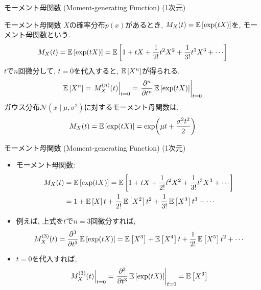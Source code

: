 \documentclass[dvipdfmx,notheorems,t]{beamer}
\begin{document}
\begin{frame}{モーメント母関数 (Moment-generating Function) (1次元)}
\begin{block}{モーメント母関数}
  $X$の確率分布$p(x)$があるとき, $M_X(t) = \operatorname{\mathbb{E}} \left[ \exp(tX) \right]$を, モーメント母関数という.
  \begin{align*}
    M_X(t) = \E{\exp(tX)} = \E{1 + tX + \frac{1}{2!} t^2 X^2 + \frac{1}{3!} t^3 X^3 + \cdots}
  \end{align*}
  $t$で$n$回微分して, $t = 0$を代入すると, $\operatorname{\mathbb{E}} \left[ X^n \right]$が得られる.
  \begin{align*}
    \operatorname{\mathbb{E}} \left[ X^n \right] = \left. M_X^{(n)}(t) \right|_{t = 0} = \left. \pdv[n]{t} \operatorname{\mathbb{E}} \left[ \exp(tX) \right] \right|_{t = 0}
  \end{align*}
  ガウス分布$\mathcal{N}(x \mid \mu, \sigma^2)$に対するモーメント母関数は,
  \begin{align*}
    M_X(t) = \operatorname{\mathbb{E}} \left[ \exp(tX) \right] = \exp(\mu t + \frac{\sigma^2 t^2}{2})
  \end{align*}
\end{block}
\end{frame}

\begin{frame}{モーメント母関数 (Moment-generating Function) (1次元)}
\begin{itemize}
  \item モーメント母関数:
  \begin{align*}
    M_X(t) &= \E{\exp(tX)} = \E{1 + tX + \frac{1}{2!} t^2 X^2 + \frac{1}{3!} t^3 X^3 + \cdots} \\
    &= 1 + \E{X} t + \frac{1}{2!} \E{X^2} t^2 + \frac{1}{3!} \E{X^3} t^3 + \cdots
  \end{align*}
  \item 例えば, 上式を$t$で$n = 3$回微分すれば,
  \begin{align*}
    M_X^{(3)}(t) = \pdv[3]{t} \operatorname{\mathbb{E}} \left[ \exp(tX) \right] = \operatorname{\mathbb{E}} \left[ X^3 \right] + \operatorname{\mathbb{E}} \left[ X^4 \right] t
      + \frac{1}{2!} \operatorname{\mathbb{E}} \left[ X^5 \right] t^2 + \cdots
  \end{align*}
  \item $t = 0$を代入すれば,
  \begin{align*}
    \left. M_X^{(3)}(t) \right|_{t = 0} = \left. \pdv[3]{t} \operatorname{\mathbb{E}} \left[ \exp(tX) \right] \right|_{t = 0} = \operatorname{\mathbb{E}} \left[ X^3 \right]
  \end{align*}
\end{itemize}
\end{frame}
\end{document}
